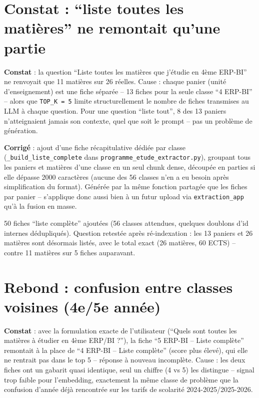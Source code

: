 \documentclass[11pt,a4paper]{report}
\begin{document}
\section{Constat : ``liste toutes les matières'' ne remontait qu'une partie}

\textbf{Constat} : la question ``Liste toutes les matières que j'étudie en 4ème
ERP-BI'' ne renvoyait que 11 matières sur 26 réelles. Cause : chaque panier
(unité d'enseignement) est une fiche séparée -- 13 fiches pour la seule classe
``4 ERP-BI'' -- alors que \texttt{TOP\_K = 5} limite structurellement le nombre de
fiches transmises au LLM à chaque question. Pour une question ``liste tout'', 8 des
13 paniers n'atteignaient jamais son contexte, quel que soit le prompt -- pas un
problème de génération.

\textbf{Corrigé} : ajout d'une fiche récapitulative dédiée par classe
(\texttt{\_build\_liste\_complete} dans
\texttt{programme\_etude\_extractor.py}), groupant tous les paniers et matières
d'une classe en un seul chunk dense, découpée en parties si elle dépasse 2000
caractères (aucune des 56 classes n'en a eu besoin après simplification du format).
Générée par la même fonction partagée que les fiches par panier -- s'applique donc
aussi bien à un futur upload via \texttt{extraction\_app} qu'à la fusion en masse.

\begin{statutfait}
50 fiches ``liste complète'' ajoutées (56 classes attendues, quelques doublons d'id
internes dédupliqués). Question retestée après ré-indexation : les 13 paniers et 26
matières sont désormais listés, avec le total exact (26 matières, 60 ECTS) --
contre 11 matières sur 5 fiches auparavant.
\end{statutfait}

\section{Rebond : confusion entre classes voisines (4e/5e année)}

\textbf{Constat} : avec la formulation exacte de l'utilisateur (``Quels sont toutes
les matières à étudier en 4ème ERP/BI ?''), la fiche ``5 ERP-BI -- Liste complète''
remontait à la place de ``4 ERP-BI -- Liste complète'' (score plus élevé), qui elle
ne rentrait pas dans le top 5 -- réponse à nouveau incomplète. Cause : les deux
fiches ont un gabarit quasi identique, seul un chiffre (4 vs 5) les distingue --
signal trop faible pour l'embedding, exactement la même classe de problème que la
confusion d'année déjà rencontrée sur les tarifs de scolarité 2024-2025/2025-2026.
\end{document}
